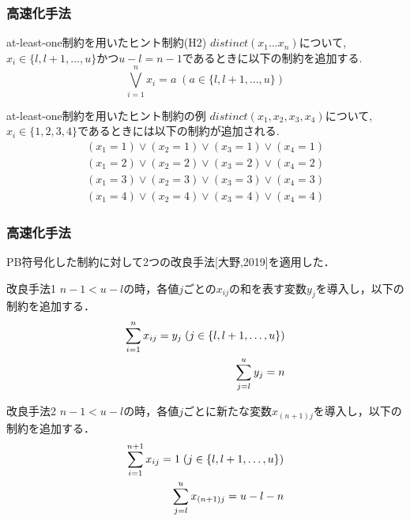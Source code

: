 \begin{frame}
    \frametitle{高速化手法}
    \vspace{-3mm}
    \begin{block}{at-least-one制約を用いたヒント制約(H2)}
        $distinct(x_1 ... x_n)$について, $x_i \in \{l, l+1, ..., u\}$かつ$u-l=n-1$であるときに以下の制約を追加する.\\
        \vspace{-3mm}
        $$\bigvee_{i=1}^n x_i=a \; (a \in \{l, l+1, ..., u\})$$
    \end{block}
    \begin{exampleblock}{at-least-one制約を用いたヒント制約の例}
        $distinct(x_1, x_2, x_3, x_4)$について, $x_i \in \{1, 2, 3, 4\}$であるときには以下の制約が追加される.
        \vspace{-3mm}
        \begin{eqnarray*}
            (x_1=1) \lor (x_2=1) \lor (x_3=1) \lor (x_4=1)\\
            (x_1=2) \lor (x_2=2) \lor (x_3=2) \lor (x_4=2)\\
            (x_1=3) \lor (x_2=3) \lor (x_3=3) \lor (x_4=3)\\
            (x_1=4) \lor (x_2=4) \lor (x_3=4) \lor (x_4=4)
        \end{eqnarray*}

    \end{exampleblock}
\end{frame}


\begin{frame}\footnotesize
    \frametitle{高速化手法}
    PB符号化した\distinct 制約に対して2つの改良手法[大野,2019]を適用した．
    \begin{block}{改良手法1}
        $n-1 < u-l$の時，各値$j$ごとの$x_{ij}$の和を表す変数$y_{j}$を導入し，以下の制約を追加する．
        \vspace{-3mm}
        \begin{eqnarray*}
            \sum_{i=1}^{n} x_{ij}=y_j \; (j \in \{l,l+1, \ldots,u\})\\
            \vspace{-3mm}
            \sum_{j=l}^{u} y_j = n
        \end{eqnarray*}
    \end{block}
    \vspace{-3mm}
    \begin{block}{改良手法2}
        $n-1 < u-l$の時，各値$j$ごとに新たな変数$x_{(n+1)j}$を導入し，以下の制約を追加する．
        \vspace{-3mm}
        \begin{eqnarray*}
            \sum_{i=1}^{n+1} x_{ij}=1 \; (j \in \{l,l+1, \ldots,u\})\\
            \vspace{-3mm}
            \sum_{j=l}^{u} x_{(n+1)j} = u-l-n
        \end{eqnarray*}
    \end{block}
\end{frame}

